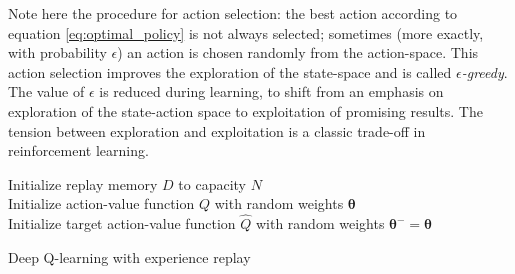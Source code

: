 Note here the procedure for action selection: the best action according to equation \ref{eq:optimal_policy} is not always selected; sometimes (more exactly, with probability $\epsilon$) an action is chosen randomly from the action-space. This action selection improves the exploration of the state-space and is called \emph{$\epsilon$-greedy}. The value of $\epsilon$ is reduced during learning, to shift from an emphasis on exploration of the state-action space to exploitation of promising results. The tension between exploration and exploitation is a classic trade-off in reinforcement learning.

\begin{algorithm}[H]
\SetAlgoLined
Initialize replay memory $D$ to capacity $N$\\
Initialize action-value function $Q$ with random weights $\bm{\theta}$\\
Initialize target action-value function $\hat{Q}$ with random weights $\bm{\theta}^- = \bm{\theta}$\\
 \caption{Deep Q-learning with experience replay}
 \label{algo:deep_q}
\end{algorithm}

